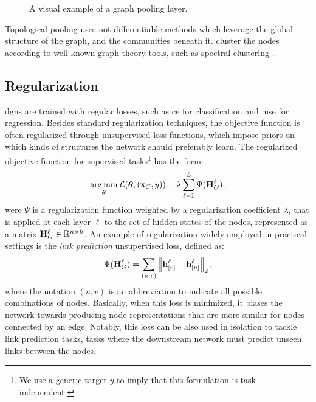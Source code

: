 \begin{figure}[h!]
    \centering
    \resizebox{.8\textwidth}{!}{}
    \caption{A visual example of a graph pooling layer.}
    \label{fig:pooling}
\end{figure}
Topological pooling uses not-differentiable methods which leverage the global structure of the graph, and the communities beneath it. cluster the nodes according to well known graph theory tools, such as spectral clustering \cite{?}.

\subsection{Regularization}
\glspl{dgn} are trained with regular losses, such as \gls{ce} for classification and \gls{mse} for regression. Besides standard regularization techniques, the objective function is often regularized through unsupervised loss functions, which impose priors on which kinds of
structures the network should preferably learn. The regularized objective function for supervised tasks\footnote{We use a generic target $y$ to imply that this formulation is task-independent.} has the form:
$$\argmin_{\Param} \Loss(\Param, (\Vector{x}_G, y)) + \lambda \sum_{\ell=1}^L \Psi(\Matrix{H}^{\ell}_G),$$
were $\Psi$ is a regularization function weighted by a regularization coefficient $\lambda$, that is applied at each layer $\ell$ to the set of hidden states of the nodes, represented as a matrix $\Matrix{h}_{G}^{\ell} \in \Real^{n \times h}$. An example of regularization widely employed in practical settings is the \emph{link prediction} unsupervised loss, defined as:
\begin{align}
    \Psi(\Matrix{H}^{\ell}_G) = \sum_{(u,v)} \Norm{\Elem{h}{v}^{\ell} - \Elem{h}{u}^{\ell}}_2,
\end{align}
where the notation $(u, v)$ is an abbreviation to indicate all possible combinations of nodes. Basically, when this loss is minimized, it biases the network towards producing node representations that are more similar for nodes connected by an edge. Notably, this loss can be also used in isolation to tackle link prediction tasks, \ie tasks where the downstream network must predict unseen links between the nodes.

